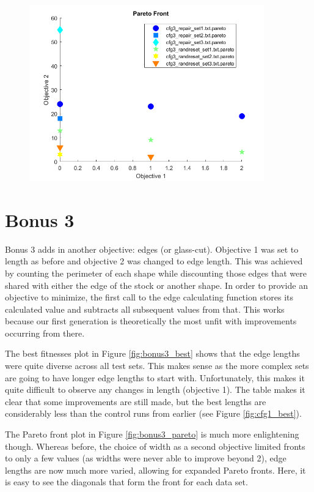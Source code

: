 \documentclass[11pt]{article}
\begin{document}
\begin{figure}[H]
	\centering
  \includegraphics[width=4in]{assn1d_cfg3_pareto.png}
  \label{fig:cfg3_pareto}
\end{figure}

\section{Bonus 3}\label{sect:bonus3}

Bonus 3 adds in another objective: edges (or glass-cut). Objective 1 was set to length as before and objective 2 was changed to edge length. This was achieved by counting the perimeter of each shape while discounting those edges that were shared with either the edge of the stock or another shape. In order to provide an objective to minimize, the first call to the edge calculating function stores its calculated value and subtracts all subsequent values from that. This works because our first generation is theoretically the most unfit with improvements occurring from there.

The best fitnesses plot in Figure \ref{fig:bonus3_best} shows that the edge lengths were quite diverse across all test sets. This makes sense as the more complex sets are going to have longer edge lengths to start with. Unfortunately, this makes it quite difficult to observe any changes in length (objective 1). The table makes it clear that some improvements are still made, but the best lengths are considerably less than the control runs from earlier (see Figure \ref{fig:cfg1_best}). 

The Pareto front plot in Figure \ref{fig:bonus3_pareto} is much more enlightening though. Whereas before, the choice of width as a second objective limited fronts to only a few values (as widths were never able to improve beyond 2), edge lengths are now much more varied, allowing for expanded Pareto fronts. Here, it is easy to see the diagonals that form the front for each data set.
\end{document}
